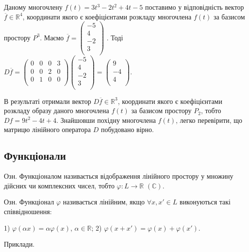 Даному многочлену $f(t) = 3t^3 - 2t^2 + 4t - 5$ поставимо у відповідність
вектор $\overline{f} \in \mathbb{R}^4$, координати якого є коефіцієнтами розкладу многочлена $f(t)$ за
базисом простору $P^3$. Маємо $\overline{f} = \begin{pmatrix}
	-5 \\
	4 \\
	-2 \\
	3 \\
\end{pmatrix}$
. Тоді $D \overline{f} = \begin{pmatrix}
	0 & 0 & 0 & 3 \\
	0 & 0 & 2 & 0 \\
	0 & 1 & 0 & 0 \\
\end{pmatrix} \begin{pmatrix}
	-5 \\
	4 \\
	-2 \\
	3 \\
\end{pmatrix} = \begin{pmatrix}
	9 \\
	-4 \\
	4 \\
\end{pmatrix}$.

В результаті отримали вектор $D\overline{f} \in \mathbb{R}^3$, координати якого є коефіцієнтами
розкладу образу даного многочлена $f(t)$ за базисом простору $P_2$, тобто 
$D f = 9 t^2 - 4 t + 4$. Знайшовши похідну многочлена $f(t)$, легко перевірити, що
матрицю лінійного оператора $D$ побудовано вірно. 

\subsection{Функціонали}

Озн. Функціоналом називається відображення лінійного простору у множину
дійсних чи комплексних чисел, тобто $\varphi: L \rightarrow \mathbb{R}$ $(\mathbb{C})$.

Озн. Функціонал $\varphi$ називається лінійним, якщо $\forall x, x' \in L$ виконуються такі
співвідношення:

1) $\varphi(\alpha x) = \alpha \varphi(x)$, $\alpha \in \mathbb{R}$;
2) $\varphi(x + x') = \varphi(x) + \varphi(x')$.

Приклади.

